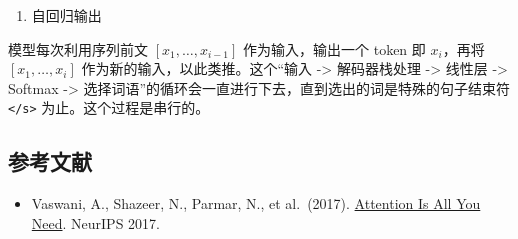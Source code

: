 \begin{enumerate}
\def\labelenumi{\arabic{enumi}.}
\setcounter{enumi}{2}
\tightlist
\item
  自回归输出
\end{enumerate}

模型每次利用序列前文 \([x_1,\ldots,x_{i-1}]\) 作为输入，输出一个 token 即 \(x_i\)，再将 \([x_1,\ldots,x_i]\) 作为新的输入，以此类推。这个``输入 -\textgreater{} 解码器栈处理 -\textgreater{} 线性层 -\textgreater{} Softmax -\textgreater{} 选择词语''的循环会一直进行下去，直到选出的词是特殊的句子结束符 \texttt{\textless{}/s\textgreater{}} 为止。这个过程是串行的。

\FloatBarrier
{}
\hypertarget{ux53c2ux8003ux6587ux732e-69}{%
\subsection{参考文献}\label{ux53c2ux8003ux6587ux732e-69}}

\vspace{0.25em}
\begin{itemize}
\tightlist
\item
  Vaswani, A., Shazeer, N., Parmar, N., et al.~(2017). \href{https://arxiv.org/abs/1706.03762}{Attention Is All You Need}. NeurIPS 2017.
\end{itemize}

\clearpage
